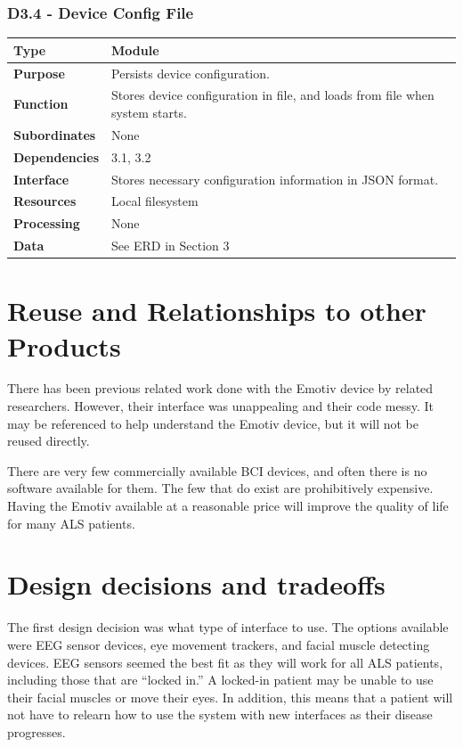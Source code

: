 \documentclass{article}
\begin{document}
\subsubsection*{D3.4 - Device Config File}
\begin{tabular}{ | l |  p{13.3cm} |}
\hline
\textbf{Type} & Module \\ \hline
\textbf{Purpose} & Persists device configuration. \\ \hline
\textbf{Function} & Stores device configuration in file, and loads from file
when system starts. \\ \hline
\textbf{Subordinates} & None \\ \hline
\textbf{Dependencies} & 3.1, 3.2 \\ \hline
\textbf{Interface} & Stores necessary configuration information in JSON
format. \\ \hline
\textbf{Resources} & Local filesystem \\ \hline
\textbf{Processing} & None \\ \hline
\textbf{Data} & See ERD in Section 3 \\ \hline
\end{tabular}

\newpage

\section{Reuse and Relationships to other Products}
\label{sec:ReuseRel}

There has been previous related work done with the Emotiv device by related
researchers. However, their interface was unappealing and their code messy. It
may be referenced to help understand the Emotiv device, but it will not be
reused directly.

There are very few commercially available BCI devices, and often there is no
software available for them. The few that do exist are prohibitively
expensive. Having the Emotiv available at a reasonable price will improve the
quality of life for many ALS patients.

\section{Design decisions and tradeoffs}

The first design decision was what type of interface to use.  The options
available were EEG sensor devices, eye movement trackers, and facial muscle
detecting devices. EEG sensors seemed the best fit as they will work for all
ALS patients, including those that are ``locked in.'' A locked-in patient
may be unable to use their facial muscles or move their eyes. In addition,
this means that a patient will not have to relearn how to use the system
with new interfaces as their disease progresses.
\end{document}
